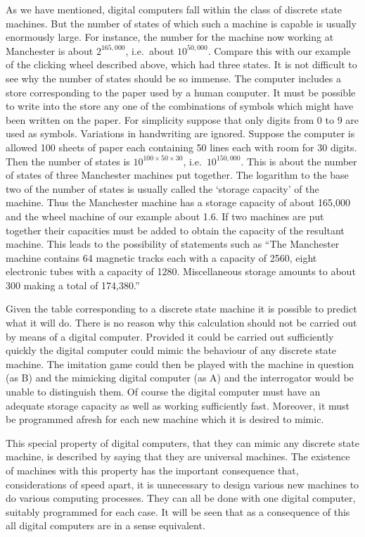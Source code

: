 \documentclass[10pt]{article} %
\begin{document}
As we have mentioned, digital computers fall within the class of discrete state machines. But the number of states of which such a machine is capable is usually enormously large. For instance, the number for the machine now working at Manchester is about $2^{165,000}$, i.e.~about $10^{50,000}$. Compare this with our example of the clicking wheel described above, which had three states. It is not difficult to see why the number of states should be so immense. The computer includes a store corresponding to the paper used by a human computer. It must be possible to write into the store any one of the combinations of symbols which might have been written on the paper. For simplicity suppose that only digits from 0 to 9 are used as symbols. Variations in handwriting are ignored. Suppose the computer is allowed 100 sheets of paper each containing 50 lines each with room for 30 digits. Then the number of states is $10^{100 \times 50 \times 30}$, i.e.~$10^{150,000}$. This is about the number of states of three Manchester machines put together. The logarithm to the base two of the number of states is usually called the `storage capacity' of the machine. Thus the Manchester machine has a storage capacity of about 165,000 and the wheel machine of our example about 1.6. If two machines are put together their capacities must be added to obtain the capacity of the resultant machine. This leads to the possibility of statements such as ``The Manchester machine contains 64 magnetic tracks each with a capacity of 2560, eight electronic tubes with a capacity of 1280. Miscellaneous storage amounts to about 300 making a total of 174,380.''\par

Given the table corresponding to a discrete state machine it is possible to predict what it will do. There is no reason why this calculation should not be carried out by means of a digital computer. Provided it could be carried out sufficiently quickly the digital computer could mimic the behaviour of any discrete state machine. The imitation game could then be played with the machine in question (as B) and the mimicking digital computer (as A) and the interrogator would be unable to distinguish them. Of course the digital computer must have an adequate storage capacity as well as working sufficiently fast. Moreover, it must be programmed afresh for each new machine which it is desired to mimic.

This special property of digital computers, that they can mimic any discrete state machine, is described by saying that they are universal machines. The existence of machines with this property has the important consequence that, considerations of speed apart, it is unnecessary to design various new machines to do various computing processes. They can all be done with one digital computer, suitably programmed for each case. It will be seen that as a consequence of this all digital computers are in a sense equivalent.
\end{document}
